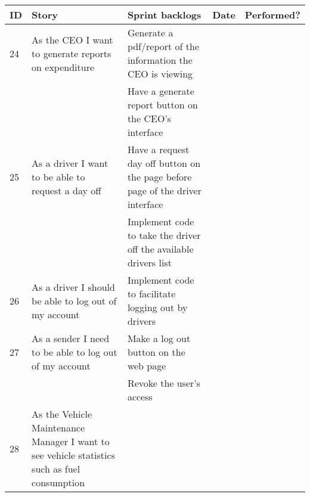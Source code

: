 \documentclass[paper=a4, fontsize=11pt]{scrartcl} %
\numberwithin{equation}{section} %
\numberwithin{figure}{section} %
\numberwithin{table}{section} %
\begin{document}
\begin{table}[!hbt]
\centering
\label{my-label}
\begin{tabular}{|p{1cm}|p{4cm}|p{4cm}|p{2cm}|p{2cm}|}
\hline
\textbf{ID} & \textbf{Story}                                                                               & \textbf{Sprint backlogs}                                                      & \textbf{Date} & \textbf{Performed?} \\ \hline
24          & As the CEO I want to generate reports on expenditure                                         & Generate a pdf/report of the information the CEO is viewing                   &               &                     \\ \hline
            &                                                                                              & Have a generate report button on the CEO's interface                          &               &                     \\ \hline
25          & As a driver I want to be able to request a day off                                           & Have a request day off button on the page before page of the driver interface &               &                     \\ \hline
            &                                                                                              & Implement code to take the driver off the available drivers list              &               &                     \\ \hline
26          & As a driver I should be able to log out of my account                                        & Implement code to facilitate logging out by drivers                           &               &                     \\ \hline
27          & As a sender I need to be able to log out of my account                                       & Make a log out button on the web page                                         &               &                     \\ \hline
            &                                                                                              & Revoke the user's access                                                      &               &                     \\ \hline
28          & As the Vehicle Maintenance Manager I want to see vehicle statistics such as fuel consumption &                                                                               &               &                     \\ \hline
\end{tabular}
\end{table}
\end{document}
